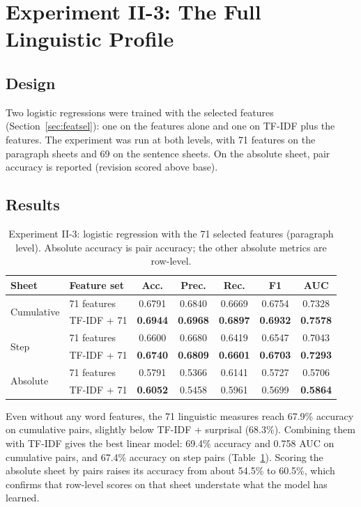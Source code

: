 \documentclass[12pt,a4paper,oneside]{report}
\begin{document}
\section{Experiment II-3: The Full Linguistic Profile}
\subsection{Design}
Two logistic regressions were trained with the selected features (Section~\ref{sec:featsel}): one on the features alone and one on TF-IDF plus the features. The experiment was run at both levels, with 71 features on the paragraph sheets and 69 on the sentence sheets. On the absolute sheet, pair accuracy is reported (revision scored above base).

\subsection{Results}
\begin{table}[ht]
\centering
\small
\caption[Experiment II-3: logistic regression with 71 features]{Experiment II-3: logistic regression with the 71 selected features (paragraph level). Absolute accuracy is pair accuracy; the other absolute metrics are row-level.}
\label{tab:exp3}
\begin{tabular}{@{}llccccc@{}}
\toprule
Sheet & Feature set & Acc. & Prec. & Rec. & F1 & AUC\\
\midrule
\multirow{2}{*}{Cumulative} & 71 features & 0.6791 & 0.6840 & 0.6669 & 0.6754 & 0.7328\\
 & TF-IDF + 71 & \textbf{0.6944} & \textbf{0.6968} & \textbf{0.6897} & \textbf{0.6932} & \textbf{0.7578}\\
\midrule
\multirow{2}{*}{Step} & 71 features & 0.6600 & 0.6680 & 0.6419 & 0.6547 & 0.7043\\
 & TF-IDF + 71 & \textbf{0.6740} & \textbf{0.6809} & \textbf{0.6601} & \textbf{0.6703} & \textbf{0.7293}\\
\midrule
\multirow{2}{*}{Absolute} & 71 features & 0.5791 & 0.5366 & 0.6141 & 0.5727 & 0.5706\\
 & TF-IDF + 71 & \textbf{0.6052} & 0.5458 & 0.5961 & 0.5699 & \textbf{0.5864}\\
\bottomrule
\end{tabular}
\end{table}

Even without any word features, the 71 linguistic measures reach 67.9\% accuracy on cumulative pairs, slightly below TF-IDF + surprisal (68.3\%). Combining them with TF-IDF gives the best linear model: 69.4\% accuracy and 0.758 AUC on cumulative pairs, and 67.4\% accuracy on step pairs (Table~\ref{tab:exp3}). Scoring the absolute sheet by pairs raises its accuracy from about 54.5\% to 60.5\%, which confirms that row-level scores on that sheet understate what the model has learned.
\end{document}
